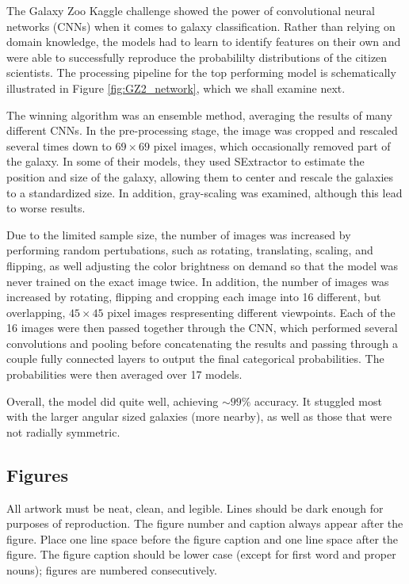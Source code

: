 \documentclass{article}
\begin{document}
The Galaxy Zoo Kaggle challenge showed the power of convolutional neural networks (CNNs) when it comes to galaxy classification. Rather than relying on domain knowledge, the models had to learn to identify features on their own and were able to successfully reproduce the probabililty distributions of the citizen scientists. The processing pipeline for the top performing model \citep{2015MNRAS.450.1441D} is schematically illustrated in Figure \ref{fig:GZ2_network}, which we shall examine next. 

The winning algorithm was an ensemble method, averaging the results of many different CNNs. In the pre-processing stage, the image was cropped and rescaled several times down to $69 \times 69$ pixel images, which occasionally removed part of the galaxy. In some of their models, they used SExtractor to estimate the position and size of the galaxy, allowing them to center and rescale the galaxies to a standardized size. In addition, gray-scaling was examined, although this lead to worse results.

Due to the limited sample size, the number of images was increased by performing random pertubations, such as rotating, translating, scaling, and flipping, as well adjusting the color brightness on demand so that the model was never trained on the exact image twice. In addition, the number of images was increased by rotating, flipping and cropping each image into 16 different, but overlapping, $45 \times 45$ pixel images respresenting different viewpoints. Each of the 16 images were then passed together through the CNN, which performed several convolutions and pooling before concatenating the results and passing through a couple fully connected layers to output the final categorical probabilities. The probabilities were then averaged over 17 models.

Overall, the model did quite well, achieving $\sim 99\%$ accuracy. It stuggled most with the larger angular sized galaxies (more nearby), as well as those that were not radially symmetric.




\iffalse

\subsection{Figures}

All artwork must be neat, clean, and legible. Lines should be dark
enough for purposes of reproduction. The figure number and caption
always appear after the figure. Place one line space before the figure
caption and one line space after the figure. The figure caption should
be lower case (except for first word and proper nouns); figures are
numbered consecutively.
\end{document}
